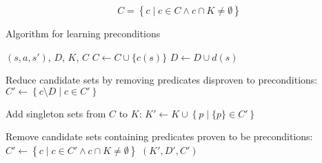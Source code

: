 \documentclass[../../Master.tex]{subfiles}
\begin{document}
\begin{equation} \label{eq:removeKnown}
    C = \left\{ c \; | \; c \in C \land c \cap K \neq \emptyset \right\}
\end{equation}

\begin{algorithm}\label{algo:precondLearn}
    \caption{Algorithm for learning preconditions}

    \begin{algorithmic}
         {$\left( s, a, s'\right)$, $D$, $K$, $C$}
                \State $C \gets C \cup \{ c(s) \}$
                \State $D \gets D \cup d(s)$
            \EndIf

            \State Reduce candidate sets by removing predicates disproven to preconditions:
            \State $C' \gets \left\{ c \setminus D \; | \; c \in C' \right\}$

            \State Add singleton sets from $C$ to $K$:
            \State $K' \gets K \cup \left\{ p \; | \; \{ p \} \in C' \right\}$

            \State Remove candidate sets containing predicates proven to be preconditions:
            \State $C' \gets \left\{ c \; | \; c \in C' \land c \cap K \neq \emptyset \right\}$
            \State \Return $(K', D', C')$
        \EndFunction%
    \end{algorithmic}
\end{algorithm}
\end{document}
